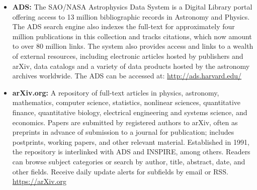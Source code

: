 \begin{itemize}
\item
  \textbf{ADS:} The SAO/NASA Astrophysics Data System is a Digital
  Library portal offering access to 13 million bibliographic records in
  Astronomy and Physics. The ADS search engine also indexes the
  full-text for approximately four million publications in this
  collection and tracks citations, which now amount to over 80 million
  links. The system also provides access and links to a wealth of
  external resources, including electronic articles hosted by publishers
  and arXiv, data catalogs and a variety of data products hosted by the
  astronomy archives worldwide. The ADS can be accessed at:
  \url{http://ads.harvard.edu/}
\item
  \textbf{arXiv.org:} A repository of full-text articles in physics,
  astronomy, mathematics, computer science, statistics, nonlinear
  sciences, quantitative finance, quantitative biology, electrical
  engineering and systems science, and economics. Papers are submitted
  by registered authors to arXiv, often as preprints in advance of
  submission to a journal for publication; includes postprints, working
  papers, and other relevant material. Established in 1991, the
  repository is interlinked with ADS and INSPIRE, among others. Readers
  can browse subject categories or search by author, title, abstract,
  date, and other fields. Receive daily update alerts for subfields by
  email or RSS. \url{https://arXiv.org}


\end{itemize}
